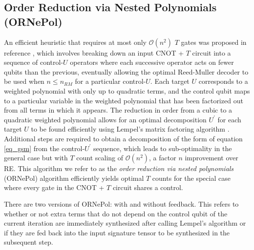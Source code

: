 \documentclass[notitlepage]{article}
\theoremstyle{definition}
\theoremstyle{problem}
\theoremstyle{lemma}
\begin{document}
\subsection{Order Reduction via Nested Polynomials (ORNePol)}
An efficient heuristic that requires at most only $\mathcal{O}(n^2)$ $T$ gates was proposed in reference \cite{4_Campbell_2017}, which involves breaking down an input CNOT + $T$ circuit into a sequence of control-$U$ operators where each successive operator acts on fewer qubits than the previous, eventually allowing the optimal Reed-Muller decoder to be used when $n\leq n_{RM}$ for a particular control-$U$. Each target $U$ corresponds to a weighted polynomial with only up to quadratic terms, and the control qubit maps to a particular variable in the weighted polynomial that has been factorized out from all terms in which it appears. The reduction in order from a cubic to a quadratic weighted polynomial allows for an optimal decomposition $U^\prime$ for each target $U$ to be found efficiently using Lempel's matrix factoring algorithm \cite{8_Lempel_1975}. Additional steps are required to obtain a decomposition of the form of equation \ref{eq_gsm} from the control-$U^\prime$ sequence, which leads to sub-optimality in the general case but with $T$ count scaling of $\mathcal{O}(n^2)$, a factor $n$ improvement over RE. This algorithm we refer to as the \emph{order reduction via nested polynomials} (ORNePol) algorithm efficiently yields optimal $T$ counts for the special case where every gate in the CNOT + $T$ circuit shares a control.

There are two versions of ORNePol: with and without feedback. This refers to whether or not extra terms that do not depend on the control qubit of the current iteration are immediately synthesized after calling Lempel's algorithm or if they are fed back into the input signature tensor to be synthesized in the subsequent step.
\end{document}
